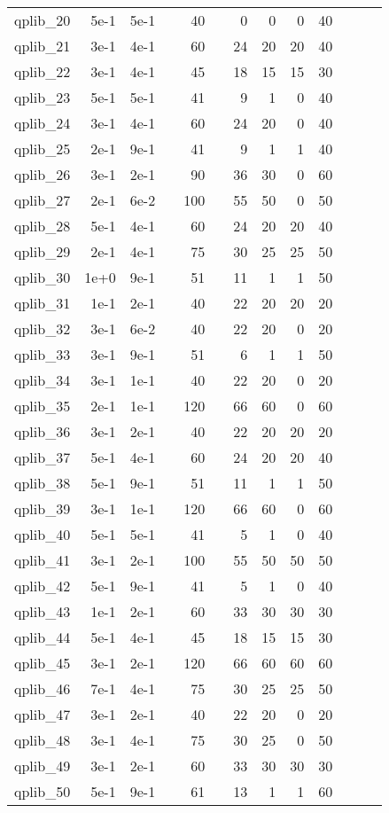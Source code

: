 \begin{table}
\begin{tabular}{lrrrrrrrrrrrr}
qplib\_20	&	5e-1	&	5e-1	&	&	40	&	&	0	&	0	&	0	&	40	\\
qplib\_21	&	3e-1	&	4e-1	&	&	60	&	&	24	&	20	&	20	&	40	\\
qplib\_22	&	3e-1	&	4e-1	&	&	45	&	&	18	&	15	&	15	&	30	\\
qplib\_23	&	5e-1	&	5e-1	&	&	41	&	&	9	&	1	&	0	&	40	\\
qplib\_24	&	3e-1	&	4e-1	&	&	60	&	&	24	&	20	&	0	&	40	\\
qplib\_25	&	2e-1	&	9e-1	&	&	41	&	&	9	&	1	&	1	&	40	\\
qplib\_26	&	3e-1	&	2e-1	&	&	90	&	&	36	&	30	&	0	&	60	\\
qplib\_27	&	2e-1	&	6e-2	&	&	100	&	&	55	&	50	&	0	&	50	\\
qplib\_28	&	5e-1	&	4e-1	&	&	60	&	&	24	&	20	&	20	&	40	\\
qplib\_29	&	2e-1	&	4e-1	&	&	75	&	&	30	&	25	&	25	&	50	\\
qplib\_30	&	1e+0	&	9e-1	&	&	51	&	&	11	&	1	&	1	&	50	\\
qplib\_31	&	1e-1	&	2e-1	&	&	40	&	&	22	&	20	&	20	&	20	\\
qplib\_32	&	3e-1	&	6e-2	&	&	40	&	&	22	&	20	&	0	&	20	\\
qplib\_33	&	3e-1	&	9e-1	&	&	51	&	&	6	&	1	&	1	&	50	\\
qplib\_34	&	3e-1	&	1e-1	&	&	40	&	&	22	&	20	&	0	&	20	\\
qplib\_35	&	2e-1	&	1e-1	&	&	120	&	&	66	&	60	&	0	&	60	\\
qplib\_36	&	3e-1	&	2e-1	&	&	40	&	&	22	&	20	&	20	&	20	\\
qplib\_37	&	5e-1	&	4e-1	&	&	60	&	&	24	&	20	&	20	&	40	\\
qplib\_38	&	5e-1	&	9e-1	&	&	51	&	&	11	&	1	&	1	&	50	\\
qplib\_39	&	3e-1	&	1e-1	&	&	120	&	&	66	&	60	&	0	&	60	\\
qplib\_40	&	5e-1	&	5e-1	&	&	41	&	&	5	&	1	&	0	&	40	\\
qplib\_41	&	3e-1	&	2e-1	&	&	100	&	&	55	&	50	&	50	&	50	\\
qplib\_42	&	5e-1	&	9e-1	&	&	41	&	&	5	&	1	&	0	&	40	\\
qplib\_43	&	1e-1	&	2e-1	&	&	60	&	&	33	&	30	&	30	&	30	\\
qplib\_44	&	5e-1	&	4e-1	&	&	45	&	&	18	&	15	&	15	&	30	\\
qplib\_45	&	3e-1	&	2e-1	&	&	120	&	&	66	&	60	&	60	&	60	\\
qplib\_46	&	7e-1	&	4e-1	&	&	75	&	&	30	&	25	&	25	&	50	\\
qplib\_47	&	3e-1	&	2e-1	&	&	40	&	&	22	&	20	&	0	&	20	\\
qplib\_48	&	3e-1	&	4e-1	&	&	75	&	&	30	&	25	&	0	&	50	\\
qplib\_49	&	3e-1	&	2e-1	&	&	60	&	&	33	&	30	&	30	&	30	\\
qplib\_50	&	5e-1	&	9e-1	&	&	61	&	&	13	&	1	&	1	&	60	\\





\end{tabular}
\end{table}
